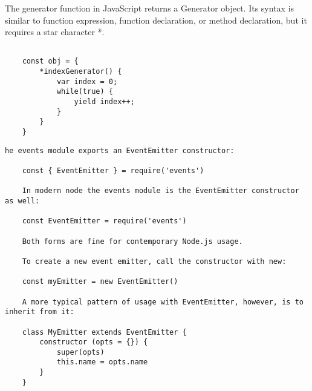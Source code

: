 \documentclass{scrartcl}
\begin{document}
The generator function in JavaScript returns a Generator object.
Its syntax is similar to function expression, function declaration, or method declaration, but it requires a star character *.

\begin{lstlisting}[style=ES6]

    const obj = {
        *indexGenerator() {
            var index = 0;
            while(true) {
                yield index++;
            }
        }
    }

\end{lstlisting}


\begin{lstlisting}[style=ES6]
    he events module exports an EventEmitter constructor:

    const { EventEmitter } = require('events')

    In modern node the events module is the EventEmitter constructor as well:

    const EventEmitter = require('events')

    Both forms are fine for contemporary Node.js usage.

    To create a new event emitter, call the constructor with new:

    const myEmitter = new EventEmitter()

    A more typical pattern of usage with EventEmitter, however, is to inherit from it:

    class MyEmitter extends EventEmitter {
        constructor (opts = {}) {
            super(opts)
            this.name = opts.name
        }
    }

\end{lstlisting}
\end{document}
